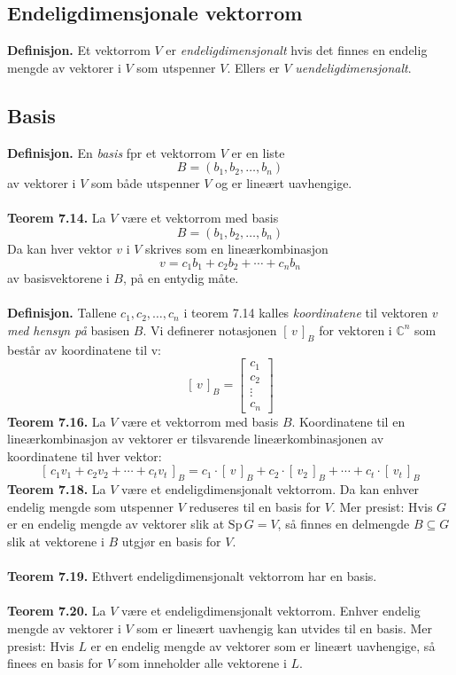 \documentclass{article}
\begin{document}
\subsection{Endeligdimensjonale vektorrom}
\textbf{Definisjon.} Et vektorrom $V$ er \textit{endeligdimensjonalt} hvis det finnes en endelig mengde av vektorer i $V$ som utspenner $V$. Ellers er $V$ \textit{uendeligdimensjonalt}.


\subsection{Basis}
\textbf{Definisjon.} En \textit{basis} fpr et vektorrom $V$ er en liste
\[ B = (b_1, b_2, \dots, b_n) \]
av vektorer i $V$ som både utspenner $V$ og er lineært uavhengige.
\\\\
\textbf{Teorem 7.14.} La $V$ være et vektorrom med basis
\[ B = (b_1, b_2, \dots, b_n) \]
Da kan hver vektor $v$ i $V$ skrives som en lineærkombinasjon
\[ v = c_1b_1 + c_2b_2 + \cdots + c_nb_n \]
av basisvektorene i $B$, på en entydig måte.
\\\\
\textbf{Definisjon.} Tallene $c_1, c_2, \dots, c_n$ i teorem 7.14 kalles \textit{koordinatene} til vektoren $v$ \textit{med hensyn på} basisen $B$. Vi definerer notasjonen $[\,v\,]_B$ for vektoren i $\mathbb{C}^n$ som består av koordinatene til v:
\[ [\,v\,]_B = \begin{bmatrix}
    c_1 \\ c_2 \\ \vdots \\ c_n
\end{bmatrix} \]
\textbf{Teorem 7.16.} La $V$ være et vektorrom med basis $B$. Koordinatene til en lineærkombinasjon av vektorer er tilsvarende lineærkombinasjonen av koordinatene til hver vektor:
\[ [\, c_1v_1 + c_2v_2 + \cdots + c_tv_t\,]_B = c_1 \cdot [\,v\,]_B + c_2 \cdot [\,v_2\,]_B + \cdots + c_t \cdot [\,v_t\,]_B \]
\textbf{Teorem 7.18.} La $V$ være et endeligdimensjonalt vektorrom. Da kan enhver endelig mengde som utspenner $V$ reduseres til en basis for $V$. Mer presist: Hvis $G$ er en endelig mengde av vektorer slik at $\text{Sp}\,G = V$, så finnes en delmengde $B \subseteq G$ slik at vektorene i $B$ utgjør en basis for $V$.
\\\\
\textbf{Teorem 7.19.} Ethvert endeligdimensjonalt vektorrom har en basis.
\\\\
\textbf{Teorem 7.20.} La $V$ være et endeligdimensjonalt vektorrom. Enhver endelig mengde av vektorer i $V$ som er lineært uavhengig kan utvides til en basis. Mer presist: Hvis $L$ er en endelig mengde av vektorer som er lineært uavhengige, så finees en basis for $V$ som inneholder alle vektorene i $L$.
\end{document}
